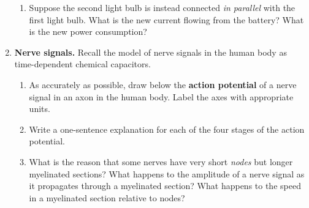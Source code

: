 \documentclass[10pt]{article}
\begin{document}
\begin{enumerate}
\begin{enumerate}
\item Suppose the second light bulb is instead connected \textit{in parallel} with the first light bulb.  What is the new current flowing from the battery? What is the new power consumption? \\ \vspace{1.5cm}
\end{enumerate}
\item \textbf{Nerve signals.} Recall the model of nerve signals in the human body as time-dependent chemical capacitors.
\begin{enumerate}
\item As accurately as possible, draw below the \textbf{action potential} of a nerve signal in an axon in the human body.  Label the axes with appropriate units. \\ \vspace{4cm}
\item Write a one-sentence explanation for each of the four stages of the action potential. \\ \vspace{2cm}
\item What is the reason that some nerves have very short \textit{nodes} but longer myelinated sections?  What happens to the amplitude of a nerve signal as it propagates through a myelinated section?  What happens to the speed in a myelinated section relative to nodes?
\end{enumerate}
\end{enumerate}
\end{document}
